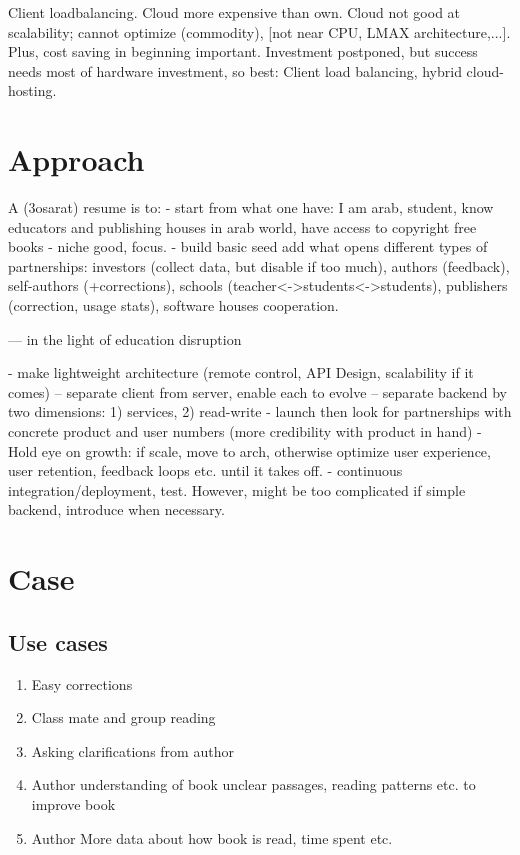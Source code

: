 \documentclass[a4paper,10pt]{book}
\begin{document}
Client loadbalancing.
Cloud more expensive than own. Cloud not good at scalability; cannot optimize (commodity), [not near CPU, LMAX architecture,...].
Plus, cost saving in beginning important. Investment postponed, but success needs most of hardware investment, so best:
Client load balancing, hybrid cloud-hosting.

\section{Approach}
A (3osarat) resume is to:
- start from what one have: I am arab, student, know educators and publishing houses in arab world, have access to copyright free books
- niche good, focus.
- build basic seed add what opens different types of partnerships: investors (collect data, but disable if too much), authors (feedback), 
self-authors (+corrections), schools (teacher<->students<->students), publishers (correction, usage stats), software houses cooperation.

--- in the light of education disruption

- make lightweight architecture (remote control, API Design, scalability if it comes)
-- separate client from server, enable each to evolve 
-- separate backend by two dimensions: 1) services, 2) read-write
- launch then look for partnerships with concrete product and user numbers (more credibility with product in hand)
- Hold eye on growth: if scale, move to arch, otherwise optimize user experience, user retention, feedback loops etc. until it takes off.
- continuous integration/deployment, test. However, might be too complicated if simple backend, introduce when necessary.


\section{Case}
\subsection{Use cases}
\begin{enumerate}
\item Easy corrections
\item Class mate and group reading
\item Asking clarifications from author
\item Author understanding of book unclear passages, reading patterns etc. to improve book
\item Author More data about how book is read, time spent etc.
\end{enumerate}
 
\end{document}

